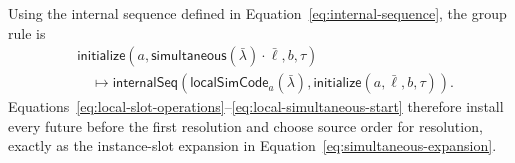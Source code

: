 \documentclass[11pt]{article}
\numberwithin{equation}{section}
\newcommand{\kw}[1]{\ensuremath{\mathsf{#1}}}
\begin{document}
Using the internal sequence defined in
Equation~\eqref{eq:internal-sequence}, the group rule is
\begin{equation}\label{eq:local-simultaneous-start}
\begin{split}
 &\kw{initialize}(a,
     \kw{simultaneous}(\bar\lambda)\cdot\bar\ell,b,\tau)\\
 &\quad\longmapsto
 \kw{internalSeq}(\mathsf{localSimCode}_a(\bar\lambda),
                  \kw{initialize}(a,\bar\ell,b,\tau)).
\end{split}
\end{equation}
Equations~\eqref{eq:local-slot-operations}--\eqref{eq:local-simultaneous-start}
therefore install every future before the first resolution and choose source
order for resolution, exactly as the instance-slot expansion in
Equation~\eqref{eq:simultaneous-expansion}.
\end{document}
